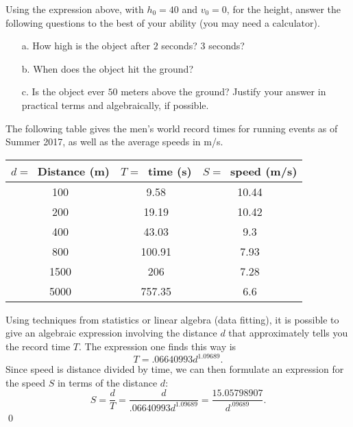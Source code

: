 \begin{question} Using the expression above, with $h_0 = 40$ and $v_0 = 0$, for the height, answer the following questions to the best of your ability (you may need a calculator).
\begin{enumerate}
\item[a.] How high is the object after $2$ seconds? $3$ seconds?
\item[b.] When does the object hit the ground?
\item[c.] Is the object ever $50$ meters above the ground? Justify your answer in practical terms and algebraically, if possible.
\end{enumerate}
\end{question}

\par 

\begin{eg} The following table gives the men's world record times for running events as of Summer 2017, as well as the average speeds in m/s.\\
\begin{center}
\begin{tabular}{| c | c | c |}
\hline $d=$\ Distance (m) & $T=$\ time (s) & $S=$\ speed (m/s)\\
\hline\hline 100  & 9.58 & 10.44\\
\hline 200 & 19.19 & 10.42\\
\hline 400 & 43.03 & 9.3\\
\hline 800 & 100.91 & 7.93\\
\hline 1500 & 206 & 7.28\\
\hline 5000 & 757.35 & 6.6\\
\hline
\end{tabular}
\end{center}
Using techniques from statistics or linear algebra (data fitting), it is possible to give an algebraic expression involving the distance $d$ that approximately tells you the record time $T$. The expression one finds this way is
\[
T = .06640993d^{1.09689}.
\]
Since speed is distance divided by time, we can then formulate an expression for the speed $S$ in terms of the distance $d$:
\[
S = \frac{d}{T}  = \frac{d}{.06640993 d^{1.09689}} = \frac{15.05798907}{d^{.09689}}.
\]
\qed
\end{eg}

